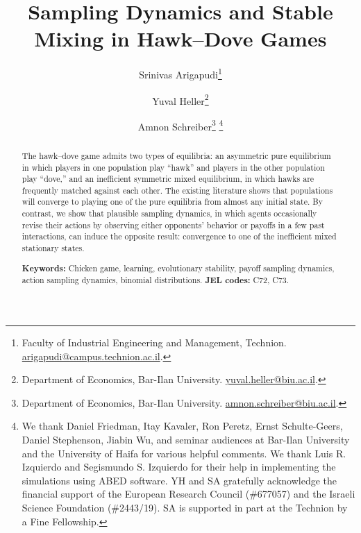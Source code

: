 \documentclass[12pt]{article}
\numberwithin{equation}{section}
\numberwithin{figure}{section}
\theoremstyle{definition}
\theoremstyle{plain}
\theoremstyle{plain}
\theoremstyle{plain}
\theoremstyle{remark}
\theoremstyle{plain}
\theoremstyle{plain}
\begin{document}
\title{{\large{}Sampling Dynamics and Stable Mixing in Hawk--Dove Games\\}}
\author{Srinivas Arigapudi\thanks{
Faculty of Industrial Engineering and Management, Technion. \protect\href{mailto:arigapudi@campus.technion.ac.il}{arigapudi@campus.technion.ac.il}.}
\and Yuval Heller\thanks{Department of Economics, Bar-Ilan University.  \protect\href{mailto:yuval.heller@biu.ac.il}{yuval.heller@biu.ac.il}. }
\and Amnon Schreiber\thanks{Department of Economics, Bar-Ilan University.  \protect\href{mailto:amnon.schreiber@biu.ac.il}{amnon.schreiber@biu.ac.il}. }
\thanks{We thank Daniel Friedman, Itay Kavaler, Ron Peretz, Ernst Schulte-Geers, Daniel Stephenson, Jiabin Wu, and seminar audiences at Bar-Ilan University and the University of Haifa for various helpful comments. We thank  Luis R. Izquierdo and Segismundo S. Izquierdo for their help in implementing the simulations using ABED software. YH and SA  gratefully acknowledge the financial support of the European Research
Council (\#677057) and the Israeli Science Foundation (\#2443/19). SA is supported in part at the Technion by a Fine Fellowship.
}}
\maketitle
\begin{abstract}
The hawk--dove game admits two 
types of equilibria: an asymmetric pure equilibrium in which players in one population play “hawk'' and players in the other population play ``dove,'' and an 
inefficient symmetric  mixed equilibrium, 
in which hawks are frequently matched against each other.
The existing  
literature shows that populations will converge to playing one of the 
pure equilibria  from almost any initial state. By contrast, we show that plausible sampling dynamics, in which agents occasionally revise their actions by observing either opponents' behavior or payoffs in a few past interactions, can induce the opposite result:  
convergence to one of the inefficient mixed stationary states. 


\noindent \textbf{Keywords:} Chicken game, learning, evolutionary stability,  payoff sampling dynamics, action sampling dynamics, binomial distributions. \textbf{JEL codes: }C72, C73.
\end{abstract}
\end{document}
